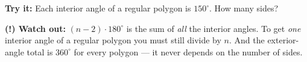 \documentclass[12pt]{article}
\begin{document}
\begin{tryitbox}
\textbf{Try it:} \quad Each interior angle of a regular polygon is $150^\circ$. How many sides?\\[2pt]
\end{tryitbox}

\begin{watchoutbox}
\textbf{(!) Watch out:} $(n-2)\cdot 180^\circ$ is the sum of \emph{all} the interior angles. To get \emph{one} interior angle of a regular polygon you must still divide by $n$. And the exterior-angle total is $360^\circ$ for every polygon --- it never depends on the number of sides.
\end{watchoutbox}
\end{document}
